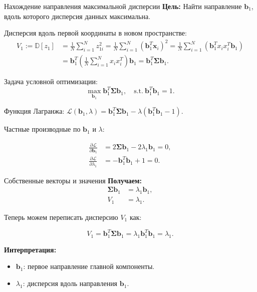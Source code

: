 \begin{frame}[allowframebreaks]{Нахождение направления максимальной дисперсии}
    \textbf{Цель:} Найти направление $\boldsymbol{b}_1$, вдоль которого дисперсия данных максимальна.

    Дисперсия вдоль первой координаты в новом пространстве:
    \begin{align*}
        V_1 := \mathbb{D}[z_1] & = \frac{1}{N}\sum_{i=1}^Nz_{1i}^2 = \frac{1}{N}\sum_{i=1}^N(\boldsymbol{b}_1^T\boldsymbol{x}_i)^2  = \frac{1}{N}\sum_{i=1}^N(\boldsymbol{b}_1^Tx_ix_i^T\boldsymbol{b}_1) \\
                               & = \boldsymbol{b}_1^T\left(\frac{1}{N}\sum_{i=1}^Nx_ix_i^T\right)\boldsymbol{b}_1 = \boldsymbol{b}_1^T\boldsymbol{\Sigma}\boldsymbol{b}_1.
    \end{align*}

    \framebreak

    Задача условной оптимизации:
    $$
        \max_{\boldsymbol{b}_1} \boldsymbol{b}_1^T \boldsymbol{\Sigma} \boldsymbol{b}_1, \quad\text{s.t.} \: \boldsymbol{b}_1^T \boldsymbol{b}_1 = 1.
    $$

    Функция Лагранжа: \(\mathcal{L}(\boldsymbol{b}_1, \lambda) = \boldsymbol{b}_1^T \boldsymbol{\Sigma} \boldsymbol{b}_1 - \lambda(\boldsymbol{b}_1^T \boldsymbol{b}_1 - 1)\).

    Частные производные по $\boldsymbol{b}_1$ и $\lambda$:

    \begin{align*}
        \frac{\partial\mathcal{L}}{\partial\boldsymbol{b}_1} & = 2\boldsymbol{\Sigma}\boldsymbol{b}_1 - 2\lambda_1\boldsymbol{b}_1 = 0, \\
        \frac{\partial\mathcal{L}}{\partial\lambda_1}        & = -\boldsymbol{b}_1^T\boldsymbol{b}_1 + 1 = 0.
    \end{align*}
\end{frame}

\begin{frame}{Собственные векторы и значения}
    \textbf{Получаем:}
    \begin{align*}
        \boldsymbol{\Sigma} \boldsymbol{b}_1 & = \lambda_1 \boldsymbol{b}_1, \\
        V_1                                  & = \lambda_1.
    \end{align*}

    Теперь можем переписать дисперсию $V_1$ как:

    $$
        V_1 = \boldsymbol{b}_1^T\boldsymbol{\Sigma}\boldsymbol{b}_1 = \lambda_1\boldsymbol{b}_1^T\boldsymbol{b}_1 = \lambda_1.
    $$

    \textbf{Интерпретация:}
    \begin{itemize}
        \item $\boldsymbol{b}_1$: первое направление главной компоненты.
        \item $\lambda_1$: дисперсия вдоль направления $\boldsymbol{b}_1$.
    \end{itemize}
\end{frame}

